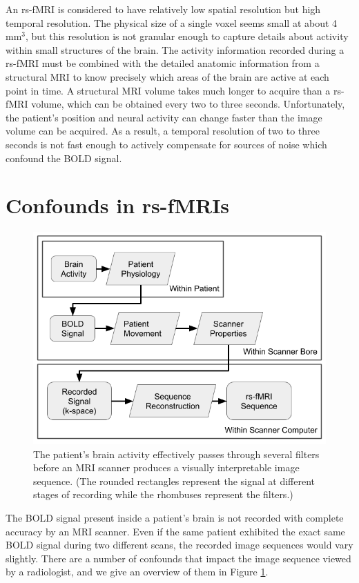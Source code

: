 An rs-fMRI is considered to have relatively low spatial resolution but high temporal resolution. The physical size of a single voxel seems small at about 4 mm$^3$, but this resolution is not granular enough to capture details about activity within small structures of the brain. The activity information recorded during a rs-fMRI must be combined with the detailed anatomic information from a structural MRI to know precisely which areas of the brain are active at each point in time. A structural MRI volume takes much longer to acquire than a rs-fMRI volume, which can be obtained every two to three seconds. Unfortunately, the patient's position and neural activity can change faster than the image volume can be acquired. As a result, a temporal resolution of two to three seconds is not fast enough to actively compensate for sources of noise which confound the BOLD signal. 

\section{Confounds in rs-fMRIs}

\begin{figure}
\centering
\includegraphics[width=.6\textwidth]{2/rsfMRI-signal-filters.png}
\caption{The patient's brain activity effectively passes through several filters before an MRI scanner produces a visually interpretable image sequence. (The rounded rectangles represent the signal at different stages of recording while the rhombuses represent the filters.)}
\label{ch2:fig:signal-filters}
\end{figure}

The BOLD signal present inside a patient's brain is not recorded with complete accuracy by an MRI scanner. Even if the same patient exhibited the exact same BOLD signal during two different scans, the recorded image sequences would vary slightly. There are a number of confounds that impact the image sequence viewed by a radiologist, and we give an overview of them in Figure \ref{ch2:fig:signal-filters}. 

